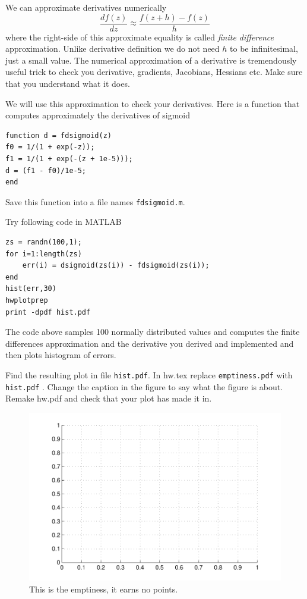 \documentclass{article}
\begin{document}
\newproblem{0.5pt}
We can approximate derivatives numerically
\[
\frac{df(z)}{dz}\approx \frac{f(z+h) - f(z)}{h}
\]
where the right-side of this approximate equality is called {\em finite difference} approximation. Unlike derivative definition we do not need $h$ to be infinitesimal, just a small value. The numerical approximation of a derivative is tremendously useful trick to check you derivative, gradients, Jacobians, Hessians etc. Make sure that you understand what it does.

We will use this approximation to check your derivatives. Here is a function that computes approximately the derivatives of sigmoid
\begin{verbatim}
function d = fdsigmoid(z)
f0 = 1/(1 + exp(-z));
f1 = 1/(1 + exp(-(z + 1e-5)));
d = (f1 - f0)/1e-5;
end
\end{verbatim}
Save this function into a file names \texttt{fdsigmoid.m}.

Try following code in MATLAB
\begin{verbatim}
zs = randn(100,1);
for i=1:length(zs)
    err(i) = dsigmoid(zs(i)) - fdsigmoid(zs(i));
end
hist(err,30)
hwplotprep
print -dpdf hist.pdf
\end{verbatim}
The code above samples 100 normally distributed values and computes the finite differences approximation and the derivative you derived and implemented and then plots histogram of errors.

Find the resulting plot in file {\tt hist.pdf}. In hw\theHW.tex replace {\tt emptiness.pdf} with {\tt hist.pdf} . Change the
caption in the figure to say what the figure is about. Remake hw\theHW.pdf and check that your plot has made it in.
\begin{figure}[H]
\begin{center}
\includegraphics[scale=0.5]{emptiness.pdf}
\caption{This is the emptiness, it earns no points.}
\end{center}
\end{figure}
\end{document}
